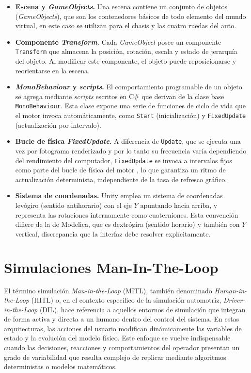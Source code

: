 \begin{itemize}
	\item \textbf{Escena y \textit{GameObjects}.} Una escena contiene un conjunto de objetos (\textit{GameObjects}), que son los contenedores básicos de todo elemento del mundo virtual, en este caso se utilizan para el chasis y las cuatro ruedas del auto.
	
	\item \textbf{Componente \textit{Transform}.} Cada \textit{GameObject} posee un componente \verb|Transform| que almacena la posición, rotación, escala y estado de jerarquía del objeto. Al modificar este componente, el objeto puede reposicionarse y reorientarse en la escena.
	
	\item \textbf{\textit{MonoBehaviour} y \textit{scripts}.} El comportamiento programable de un objeto se agrega mediante \textit{scripts} escritos en C\# que derivan de la clase base \verb|MonoBehaviour|. Esta clase expone una serie de funciones de ciclo de vida que el motor invoca automáticamente, como \verb|Start| (inicialización) y \verb|FixedUpdate| (actualización por intervalo).
	
	
	\item \textbf{Bucle de física \textit{FixedUpdate}.} A diferencia de \verb|Update|, que se ejecuta una vez por fotograma renderizado y por lo tanto su frecuencia varía dependiendo del rendimiento del computador, \verb|FixedUpdate| se invoca a intervalos fijos como parte del bucle de física del motor \cite{unity_docs}, lo que garantiza un ritmo de actualización determinista, independiente de la tasa de refresco gráfico.
	
	
	\item \textbf{Sistema de coordenadas.} Unity emplea un sistema de coordenadas levógiro (sentido antihorario) con el eje $Y$ apuntando hacia arriba, y representa las rotaciones internamente como cuaterniones. Esta convención difiere de la de Modelica, que es dextrógira (sentido horario) y también con $Y$ vertical, discrepancia que la interfaz debe resolver explícitamente.
\end{itemize}


\section{Simulaciones Man-In-The-Loop}
El término simulación \textit{Man-in-the-Loop} (MITL), también denominado \textit{Human-in-the-Loop} (HITL) o, en el contexto específico de la simulación automotriz, \textit{Driver-in-the-Loop} (DIL), hace referencia a aquellos entornos de simulación que integran de forma activa y directa a un humano dentro del control del sistema. En estas arquitecturas, las acciones del usuario modifican dinámicamente las variables de estado y la evolución del modelo físico. Este enfoque se vuelve indispensable cuando las decisiones, reacciones y comportamientos del operador presentan un grado de variabilidad que resulta complejo de replicar mediante algoritmos deterministas o modelos matemáticos.\\

